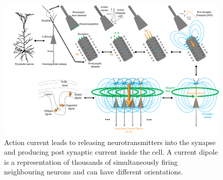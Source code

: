 \begin{figure}[htpb]
\centering
\includegraphics[width=1\textwidth]{images/ECD.png} %
\caption{Action current leads to releasing neurotransmitters into the synapse and producing post synaptic current inside the cell. A current dipole is a representation of thousands of simultaneously firing neighbouring neurons and can have different 
orientations.}
\label{fig:ECD}
\end{figure}
